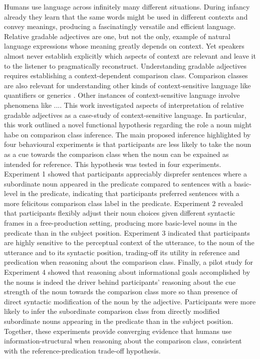  Humans use language across infinitely many different situations. During infancy already they learn that the same words might be used in different contexts and convey meanings, producing a fascinatingly versatile and efficient language. 
Relative gradable adjectives are one, but not the only, example of natural language expressions whose meaning greatly depends on context. Yet speakers almost never establish explicitly which aspects of context are relevant and leave it to the listener to pragmatically reconstruct.  Understanding gradable adjectives requires establishing a context-dependent comparison class. Comparison classes are also relevant for understanding other kinds of context-sensitive language like quantifiers \parencite{scholler2017semantic} or generics \parencite{tessler2019language}. Other instances of context-sensitive language involve phenomena like ....
This work investigated aspects of interpretation of relative gradable adjectives as a case-study of context-sensitive language. In particular, this work outlined a novel functional hypothesis regarding the role a noun might habe on comparison class inference. The main proposed inference highlighted by four behavioural experiments is that participants are less likely to take the noun as a cue towards the comparison class when the noun can be expained as intended for reference. 
This hypothesis was tested in four experiments. Experiment 1 showed that participants appreciably disprefer sentences where a subordinate noun appeared in the predicate compared to sentences with a basic-level in the predicate, indicating that participants preferred sentences with a more felicitous comparison class label in the predicate. Experiment 2 revealed that participants flexibly adjust their noun choices given different syntactic frames in a free-production setting, producing more basic-level nouns in the predicate than in the subject position. Experiment 3 indicated that participants are highly sensitive to the perceptual context of the utterance, to the noun of the utterance and to its syntactic position, trading-off its utility in reference and predication when reasoning about the comparison class. Finally, a pilot study for Experiment 4 showed that reasoning about informational goals accomplished by the nouns is indeed the driver behind participants' reasoning about the cue strength of the noun towards the comparison class more so than presence of direct syntactic modification of the noun by the adjective. Participants were more likely to infer the subordinate comparison class from directly modified subordinate nouns appearing in the predicate than in the subject position. 
Together, these experiments provide converging evidence that humans use information-structural when reasoning about the comparison class, consistent with the reference-predication trade-off hypothesis. 

